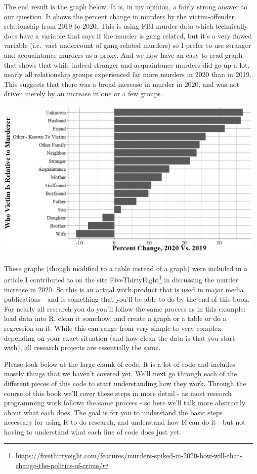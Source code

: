 \documentclass[
]{krantz}
\renewcommand{\href}[2]{#2\footnote{\url{#1}}}
\begin{document}
The end result is the graph below. It is, in my opinion, a fairly strong answer to our question. It shows the percent change in murders by the victim-offender relationship from 2019 to 2020. This is using FBI murder data which technically does have a variable that says if the murder is gang related, but it's a very flawed variable (i.e.~vast undercount of gang-related murders) so I prefer to use stranger and acquaintance murders as a proxy. And we now have an easy to read graph that shows that while indeed stranger and acquaintance murders did go up a lot, nearly all relationship groups experienced far more murders in 2020 than in 2019. This suggests that there was a broad increase in murder in 2020, and was not driven merely by an increase in one or a few groups.

\includegraphics{images/shr_motivation_example.png}

These graphs (though modified to a table instead of a graph) were included in a article I contributed to on the site \href{https://fivethirtyeight.com/features/murders-spiked-in-2020-how-will-that-change-the-politics-of-crime/}{FiveThirtyEight} in discussing the murder increase in 2020. So this is an actual work product that is used in major media publications - and is something that you'll be able to do by the end of this book. For nearly all research you do you'll follow the same process as in this example: load data into R, clean it somehow, and create a graph or a table or do a regression on it. While this can range from very simple to very complex depending on your exact situation (and how clean the data is that you start with), all research projects are essentially the same.

Please look below at the large chunk of code. It is a lot of code and includes mostly things that we haven't covered yet. We'll next go through each of the different pieces of this code to start understanding how they work. Through the course of this book we'll cover these steps in more detail - as most research programming work follows the same process - so here we'll talk more abstractly about what each does. The goal is for you to understand the basic steps necessary for using R to do research, and understand how R can do it - but not having to understand what each line of code does just yet.
\end{document}
